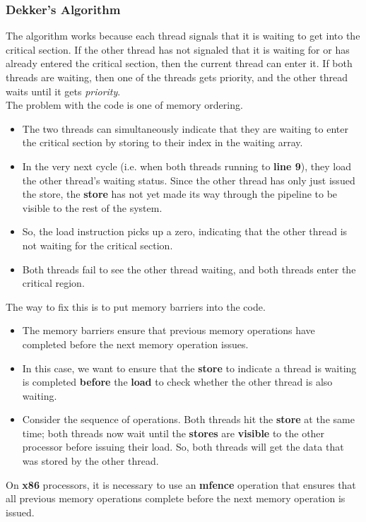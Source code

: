 \documentclass[12pt,a4paper]{report}
\begin{document}
\subsubsection*{Dekker's Algorithm}
The algorithm works because each thread signals that it is waiting to get into the critical section. If the other thread has not signaled that it is waiting for or has already entered the critical section, then the current thread can enter it. If both threads are waiting, then one of the threads gets priority, and the other thread waits until it gets \textit{priority}.
\\
The problem with the code is one of memory ordering.
\begin{itemize}
	\item The two threads can simultaneously indicate that they are waiting to enter the critical section by storing to their index in the waiting array.
	\item In the very next cycle (i.e. when both threads running to \textbf{line 9}), they load the other thread's waiting status. Since the other thread has only just issued the store, the \textbf{store} has not yet made its way through the pipeline to be visible to the rest of the system.
	\item So, the load instruction picks up a zero, indicating that the other thread is not waiting for the critical section. 
	\item Both threads fail to see the other thread waiting, and both threads enter the critical region.
\end{itemize}
The way to fix this is to put memory barriers into the code.
\begin{itemize}
	\item The memory barriers ensure that previous memory operations have completed before the next memory operation issues.
	\item In this case, we want to ensure that the \textbf{store} to indicate a thread is waiting is completed \textbf{before} the \textbf{load} to check whether the other thread is also waiting.
	\item Consider the sequence of operations. Both threads hit the \textbf{store} at the same time; both threads now wait until the \textbf{stores} are \textbf{visible} to the other processor before issuing their load. So, both threads will get the data that was stored by the other thread.
\end{itemize}
On \textbf{x86} processors, it is necessary to use an \textbf{mfence} operation that ensures that all previous memory operations complete before the next memory operation is issued.
\end{document}
